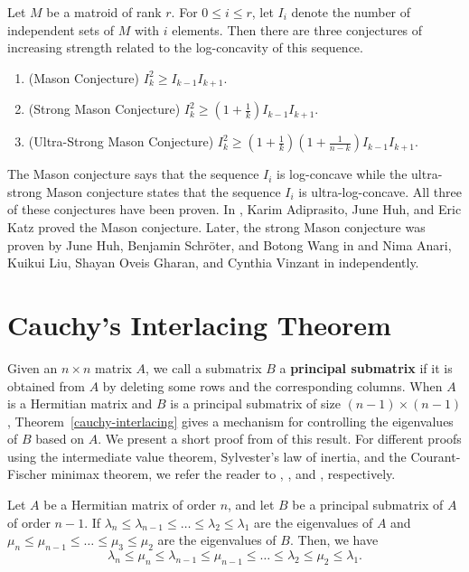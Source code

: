 \documentclass{puthesis-UG}
\begin{document}
\begin{example}
	Let $M$ be a matroid of rank $r$. For $0 \leq i \leq r$, let $I_i$ denote the number of independent sets of $M$ with $i$ elements. Then there are three conjectures of increasing strength related to the log-concavity of this sequence. 
	\begin{enumerate}
		\item (Mason Conjecture) $I_k^2 \geq I_{k-1} I_{k+1}$. 
		\item (Strong Mason Conjecture) $I_k^2 \geq \left (1 + \frac{1}{k} \right ) I_{k-1} I_{k+1}$. 
		\item (Ultra-Strong Mason Conjecture) $I_k^2 \geq \left (1 + \frac{1}{k} \right ) \left (1 + \frac{1}{n-k} \right ) I_{k-1} I_{k+1}$. 
	\end{enumerate}
	The Mason conjecture says that the sequence $I_i$ is log-concave while the ultra-strong Mason conjecture states that the sequence $I_i$ is ultra-log-concave. All three of these conjectures have been proven. In \cite{AHK}, Karim Adiprasito, June Huh, and Eric Katz proved the Mason conjecture. Later, the strong Mason conjecture was proven by June Huh, Benjamin Schr\"oter, and Botong Wang in \cite{correlation-bounds} and Nima Anari, Kuikui Liu, Shayan Oveis Gharan, and Cynthia Vinzant in \cite{anari2018logconcave} independently.  
\end{example}

\section{Cauchy's Interlacing Theorem} \label{sec:cauchy-interlacing-theorem}

Given an $n \times n$ matrix $A$, we call a submatrix $B$ a \textbf{principal submatrix} if it is obtained from $A$ by deleting some rows and the corresponding columns. When $A$ is a Hermitian matrix and $B$ is a principal submatrix of size $(n-1) \times (n-1)$, Theorem~\ref{cauchy-interlacing} gives a mechanism for controlling the eigenvalues of $B$ based on $A$. We present a short proof from \cite{fisk} of this result. For different proofs using the intermediate value theorem, Sylvester's law of inertia, and the Courant-Fischer minimax theorem, we refer the reader to \cite{suk}, \cite{symmetric-eigenvalue-problem}, and \cite{GoluVanl96}, respectively. 

\begin{thm} \label{cauchy-interlacing}
	Let $A$ be a Hermitian matrix of order $n$, and let $B$ be a principal submatrix of $A$ of order $n-1$. If $\lambda_n \leq \lambda_{n-1} \leq \ldots \leq \lambda_2 \leq \lambda_1$ are the eigenvalues of $A$ and $\mu_n \leq \mu_{n-1} \leq \ldots \leq \mu_3 \leq \mu_2$ are the eigenvalues of $B$. Then, we have
	\[
		\lambda_n \leq \mu_n \leq \lambda_{n-1} \leq \mu_{n-1} \leq \ldots \leq \lambda_2 \leq \mu_2 \leq \lambda_1.
	\]
\end{thm}
\end{document}
